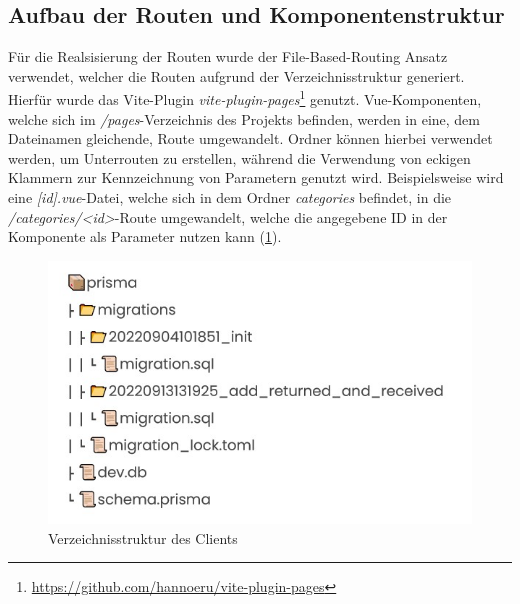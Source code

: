 \subsection{Aufbau der Routen und Komponentenstruktur}
Für die Realsisierung der Routen wurde der File-Based-Routing Ansatz verwendet, welcher die Routen
aufgrund der Verzeichnisstruktur generiert. Hierfür wurde das Vite-Plugin
\textit{vite-plugin-pages}\footnote{\url{https://github.com/hannoeru/vite-plugin-pages}} genutzt.
Vue-Komponenten, welche sich im \textit{/pages}-Verzeichnis des Projekts befinden, werden in eine,
dem Dateinamen gleichende, Route umgewandelt. Ordner können hierbei verwendet werden, um Unterrouten
zu erstellen, während die Verwendung von eckigen Klammern zur Kennzeichnung von Parametern genutzt
wird. Beispielsweise wird eine \textit{[id].vue}-Datei, welche sich in dem Ordner
\textit{categories} befindet, in die \textit{/categories/<id>}-Route umgewandelt, welche die
angegebene ID in der Komponente als Parameter nutzen kann (\ref{fig:vue}).
\begin{figure}[h]
  \centering
  \includegraphics[scale=0.7]{Bilder/Db.jpg}
  \caption[Verzeichnisstruktur des Clients]{Verzeichnisstruktur des Clients}
  \label{fig:vue}
\end{figure}

